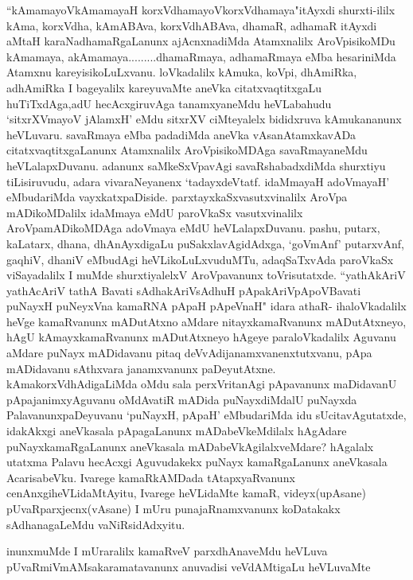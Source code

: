 \begin{artha}
``kAmamayoV\s kAmamayaH korxVdhamayoV\s korxVdhamaya"\break itAyxdi shurxti-ililx kAma, korxVdha, kAmABAva, korxVdhABAva, dhamaR, adhamaR itAyxdi aMtaH karaNadhamaRgaLanunx ajAcnxnadiMda Atamxnalilx AroVpisikoMDu kAmamaya, akAmamaya.........dhamaRmaya, adhamaRmaya eMba hesariniMda Atamxnu kareyisikoLuLxvanu. loVkadalilx kAmuka, koVpi, dhAmiRka, adhAmiRka I bageyalilx kareyuvaMte aneVka citatxvaqtitxgaLu huTiTxdAga,adU hecAcxgiruvAga tanamxyaneMdu heVLabahudu `sitxrXVmayoV jAlamxH' eMdu sitxrXV ciMteyalelx bididxruva kAmukananunx heVLuvaru. savaRmaya eMba padadiMda aneVka vAsanAtamxkavADa citatxvaqtitxgaLanunx Atamxnalilx AroVpisikoMDAga savaRmayaneMdu heVLalapxDuvanu. adanunx saMkeSxVpavAgi savaRshabadxdiMda shurxtiyu tiLisiruvudu, adara vivaraNeyanenx `tadayxdeVtatf. idaMmayaH adoVmayaH' eMbudariMda vayxkatxpaDiside. parxtayxkaSxvasutxvinalilx AroVpa mADikoMDalilx idaMmaya eMdU paroVkaSx vasutxvinalilx AroVpamADikoMDAga adoVmaya eMdU heVLalapxDuvanu. pashu, putarx, kaLatarx, dhana, dhAnAyxdigaLu puSakxlavAgidAdxga, `goVmAnf' putarxvAnf, gaqhiV, dhaniV eMbudAgi heVLikoLuLxvuduMTu, adaqSaTxvAda paroVkaSx viSayadalilx I muMde shurxtiyalelxV AroVpavanunx toVrisutatxde. ``yathAkAriV yathAcAriV tathA Bavati sAdhakAriVsAdhuH pApakAriVpApoVBavati puNayxH puNeyxVna kamaRNA pApaH pApeVnaH" idara athaR- ihaloVkadalilx heVge kamaRvanunx mADutAtxno aMdare nitayxkamaRvanunx mADutAtxneyo, hAgU kAmayxkamaRvanunx mADutAtxneyo hAgeye paraloVkadalilx Aguvanu aMdare puNayx mADidavanu pitaq deVvAdijanamxvanenxtutxvanu, pApa mADidavanu sAthxvara janamxvanunx paDeyutAtxne. kAmakorxVdhAdigaLiMda oMdu sala perxVritanAgi pApavanunx maDidavanU pApajanimxyAguvanu oMdAvatiR mADida puNayxdiMdalU puNayxda Palavanunx\break paDeyuvanu `puNayxH, pApaH' eMbudariMda idu sUcitavAgutatxde, idakAkxgi aneVkasala pApagaLanunx mADabeVkeMdilalx hAgAdare puNayxkamaRgaLanunx aneVkasala mADabeVkAgilalxveMdare? hAgalalx utatxma Palavu hecAcxgi Aguvudakekx puNayx kamaRgaLanunx aneVkasala AcarisabeVku. Ivarege kamaRkAMDada tAtapxyaRvanunx cenAnxgi\break heVLidaMtAyitu, Ivarege heVLidaMte kamaR, videyx(upAsane) pUvaRparxjecnx(vAsane) I mUru punajaRnamxvanunx koDatakakx sAdhanagaLeMdu vaNiRsidAdxyitu. 
\end{artha}

\begin{artha}
inunxmuMde I mUraralilx kamaRveV parxdhAnaveMdu heVLuva pUvaRmiVmAMsakaramatavanunx anuvadisi veVdAMtigaLu heVLuvaMte
\end{artha}

